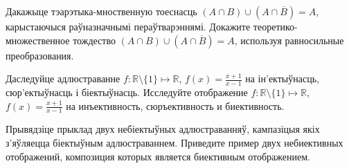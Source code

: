 \documentclass[12pt, a4paper]{article}
\begin{document}
\begin{problemList}
\bigskip

\problemItemSimple
{Дакажыце тэарэтыка-мноственную тоеснасць $(A \cap B) \cup (A \cap \overline{B}) = A$, карыстаючыся раўназначнымі пераўтварэннямі.}
{Докажите теоретико-множественное тождество $(A \cap B) \cup (A \cap \overline{B}) = A$, используя равносильные преобразования.}

\bigskip

\problemItemSimple
{Даследуйце адлюстраванне $f: \mathbb{R} \setminus \{1\} \mapsto \mathbb{R}$, $f(x) = \frac{x+1}{x-1}$
на ін'ектыўнасць, сюр'ектыўнасць і біектыўнасць. }
{Исследуйте отображение $f: \mathbb{R} \setminus \{1\} \mapsto \mathbb{R}$, $f(x) = \frac{x+1}{x-1}$
на инъективность, сюръективность и биективность.}

\bigskip

\problemItemSimple
{Прывядзіце прыклад двух небіектыўных адлюстраванняў, кампазіцыя якіх з'яўляецца біектыўным адлюстраваннем.}
{Приведите пример двух небиективных отображений, композиция которых является биективным отображением.}

\end{problemList}
\end{document}
